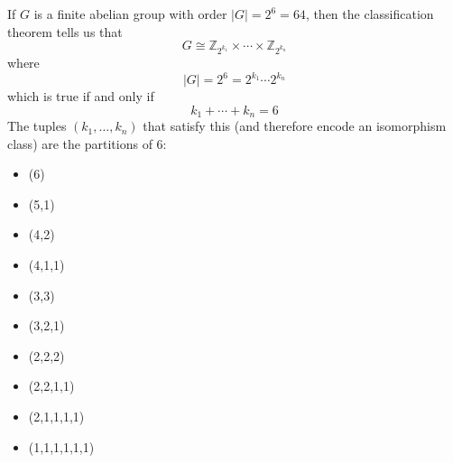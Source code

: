 \begin{sol}
    If $G$ is a finite abelian group with order $|G|=2^6=64$, then the classification theorem tells us that
    $$
        G \cong \mathbb{Z}_{2^{k_1}} \times \cdots \times \mathbb{Z}_{2^{k_n}}
    $$
    where
    $$
        |G| = 2^6 = 2^{k_1}\cdots 2^{k_n}
    $$
    which is true if and only if
    $$
        k_1 + \cdots + k_n = 6
    $$
    The tuples $(k_1,\dots,k_n)$ that satisfy this (and therefore encode an isomorphism class) are the partitions of $6$:
    \begin{itemize}
        \item (6)
        \item (5,1)
        \item (4,2)
        \item (4,1,1)
        \item (3,3)
        \item (3,2,1)
        \item (2,2,2)
        \item (2,2,1,1)
        \item (2,1,1,1,1)
        \item (1,1,1,1,1,1)
    \end{itemize}
\end{sol}
